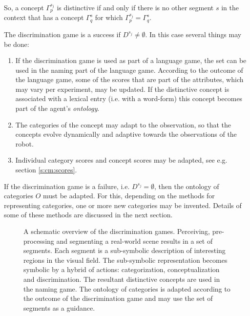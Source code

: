 \n
So, a concept $\Gamma^{s_j}_p$ is distinctive if and only if there is no other segment $s$ in the context that has a concept $\Gamma^{s}_q$ for which $\Gamma^{s_j}_p=\Gamma^s_q$. 

\p
The discrimination game is a success if $D^{s_j} \neq \emptyset$. In this case several things may be done:

\begin{enumerate}
\item If the discrimination game is used as part of a language game, the set can be used in the naming part of the language game. According to the outcome of the language game, some of the scores that are part of the attributes, which may vary per experiment, may be updated. If the distinctive concept is associated with a lexical entry (i.e. with a word-form) this concept becomes part of the agent's {\em ontology}.
\item The categories of the concept may adapt to the observation, so that the concepts evolve dynamically and adaptive towards the observations of the robot.
\item {}Individual category scores and concept scores may be adapted, see e.g. section \ref{s:cm:scores}.
\end{enumerate}

\n
If the discrimination game is a failure, i.e. $D^{s_j}=\emptyset$, then the ontology of categories $O$ must be adapted. For this, depending on the methods for representing categories, one or more new categories may be invented. Details of some of these methods are discussed in the next section.

\begin{figure}
\centerline{}
\caption{A schematic overview of the discrimination games. Perceiving, pre-processing and segmenting a real-world scene results in a set of segments. Each segment is a sub-symbolic description of interesting regions in the visual field. The sub-symbolic representation becomes symbolic by a hybrid of actions: categorization, conceptualization and discrimination. The resultant distinctive concepts are used in the naming game. The ontology of categories is adapted according to the outcome of the discrimination game and may use the set of segments as a guidance.}
\label{f:cm:dg}
\end{figure}

